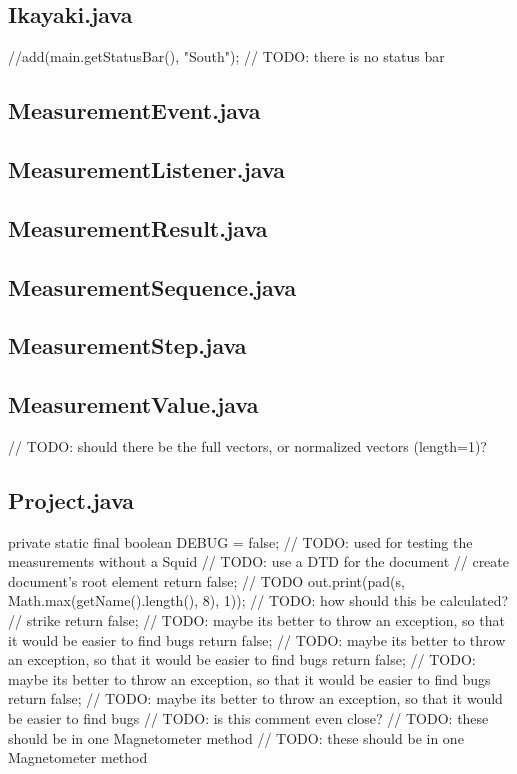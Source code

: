 \subsection{Ikayaki.java}
        //add(main.getStatusBar(), "South");    // TODO: there is no status bar

\subsection{MeasurementEvent.java}

\subsection{MeasurementListener.java}

\subsection{MeasurementResult.java}

\subsection{MeasurementSequence.java}

\subsection{MeasurementStep.java}

\subsection{MeasurementValue.java}
                        // TODO: should there be the full vectors, or normalized vectors (length=1)?

\subsection{Project.java}
    private static final boolean DEBUG = false;      // TODO: used for testing the measurements without a Squid
        // TODO: use a DTD for the document
        // create document's root element
        return false; // TODO
            out.print(pad(s, Math.max(getName().length(), 8), 1));      // TODO: how should this be calculated?
            // strike
            return false;   // TODO: maybe its better to throw an exception, so that it would be easier to find bugs
            return false;    // TODO: maybe its better to throw an exception, so that it would be easier to find bugs
            return false; // TODO: maybe its better to throw an exception, so that it would be easier to find bugs
            return false;   // TODO: maybe its better to throw an exception, so that it would be easier to find bugs
    // TODO: is this comment even close?
                // TODO: these should be in one Magnetometer method
                    // TODO: these should be in one Magnetometer method

